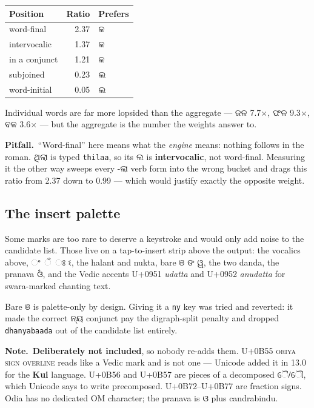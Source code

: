\documentclass[11pt, a4paper]{article}
\newcommand{\od}[1]{{\odiafont #1}}          %
\newcommand{\odb}[1]{{\odiafont\large #1}}   %
\newcommand{\kpit}{{\color{midseaorange!85!black}\textbf{\textsf{Pitfall.}}}\ }
\newcommand{\knote}{{\color{headerblue}\textbf{\textsf{Note.}}}\ }
\begin{document}
\begin{center}
\begin{tabular}{l r l}
\toprule
Position & Ratio & Prefers \\
\midrule
word-final    & 2.37 & \odb{ଳ} \\
intervocalic  & 1.37 & \odb{ଳ} \\
in a conjunct & 1.21 & \odb{ଳ} \\
subjoined     & 0.23 & \odb{ଲ} \\
word-initial  & 0.05 & \odb{ଲ} \\
\bottomrule
\end{tabular}
\end{center}

Individual words are far more lopsided than the aggregate --- \od{ଜଳ} 7.7$\times$,
\od{ଫଳ} 9.3$\times$, \od{ବଳ} 3.6$\times$ --- but the aggregate is the number the weights
answer to.

\begin{warnbox}
\kpit ``Word-final'' here means what the \emph{engine} means: nothing follows in the
roman. \od{ଥିଲା} is typed \texttt{thilaa}, so its \od{ଲ} is \textbf{intervocalic}, not
word-final. Measuring it the other way sweeps every \od{-ଲା} verb form into the wrong
bucket and drags this ratio from 2.37 down to 0.99 --- which would justify exactly the
opposite weight.
\end{warnbox}

\subsection*{The insert palette}

Some marks are too rare to deserve a keystroke and would only add noise to the candidate
list. Those live on a tap-to-insert strip above the output: the vocalics above,
\od{ଂ} \od{ଁ} \od{ଃ} \od{ଽ}, the halant and nukta, bare \od{ଞ} \od{ଙ} \od{ୱ}, the two
danda, the pranava \od{ଓଁ}, and the Vedic accents U+0951 \emph{udatta} and U+0952
\emph{anudatta} for swara-marked chanting text.

Bare \od{ଞ} is palette-only by design. Giving it a \texttt{ny} key was tried and reverted:
it made the correct \od{ନ୍ୟ} conjunct pay the digraph-split penalty and dropped
\texttt{dhanyabaada} out of the candidate list entirely.

\begin{notebox}
\knote \textbf{Deliberately not included}, so nobody re-adds them. U+0B55 \textsc{oriya
sign overline} reads like a Vedic mark and is not one --- Unicode added it in 13.0 for the
\textbf{Kui} language. U+0B56 and U+0B57 are pieces of a decomposed \od{ୈ}/\od{ୌ}, which
Unicode says to write precomposed. U+0B72--U+0B77 are fraction signs. Odia has no
dedicated OM character; the pranava is \od{ଓ} plus candrabindu.
\end{notebox}
\end{document}
